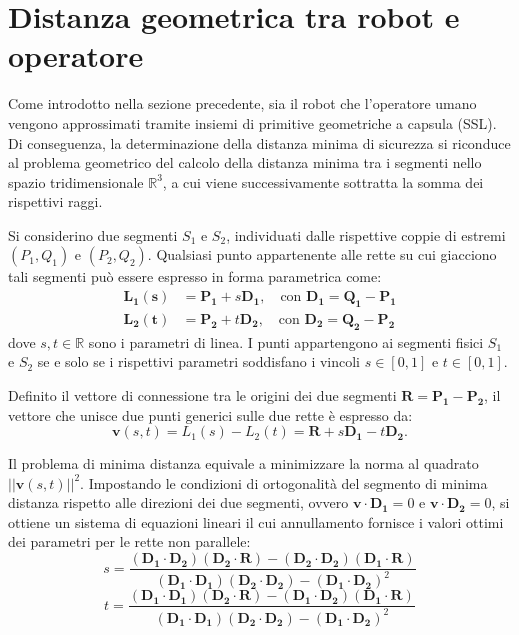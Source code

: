 \section{Distanza geometrica tra robot e operatore}

Come introdotto nella sezione precedente, sia il robot che l'operatore umano vengono approssimati tramite insiemi di primitive geometriche a capsula (SSL). Di conseguenza, la determinazione della distanza minima di sicurezza si riconduce al problema geometrico del calcolo della distanza minima tra i segmenti nello spazio tridimensionale $\mathbb{R}^3$, a cui viene successivamente sottratta la somma dei rispettivi raggi.

Si considerino due segmenti $S_1$ e $S_2$, individuati dalle rispettive coppie di estremi $(P_1, Q_1)$ e $(P_2, Q_2)$. Qualsiasi punto appartenente alle rette su cui giacciono tali segmenti può essere espresso in forma parametrica come:
\begin{align}
    \pmb{L_1(s)} &= \pmb{P_1} + s\pmb{D_1}, \quad \text{con } \pmb{D_1} = \pmb{Q_1} - \pmb{P_1} \\
    \pmb{L_2(t)} &= \pmb{P_2} + t\pmb{D_2}, \quad \text{con } \pmb{D_2} = \pmb{Q_2} - \pmb{P_2}
\end{align}
dove $s, t \in \mathbb{R}$ sono i parametri di linea. I punti appartengono ai segmenti fisici $S_1$ e $S_2$ se e solo se i rispettivi parametri soddisfano i vincoli $s \in [0,1]$ e $t \in [0, 1]$.

Definito il vettore di connessione tra le origini dei due segmenti $\pmb{R} = \pmb{P_1} - \pmb{P_2}$, il vettore che unisce due punti generici sulle due rette è espresso da:
\begin{equation}
    \pmb{v}(s,t) = L_1(s) - L_2(t) = \pmb{R} + s\pmb{D_1} - t\pmb{D_2}.
\end{equation}

Il problema di minima distanza equivale a minimizzare la norma al quadrato $||\pmb{v}(s,t)||^2$. Impostando le condizioni di ortogonalità del segmento di minima distanza rispetto alle direzioni dei due segmenti, ovvero $\pmb{v} \cdot \pmb{D_1} = 0$ e $\pmb{v} \cdot \pmb{D_2} = 0$, si ottiene un sistema di equazioni lineari il cui annullamento fornisce i valori ottimi dei parametri per le rette non parallele:
\begin{equation}
    s = \frac{(\pmb{D_1} \cdot \pmb{D_2})(\pmb{D_2} \cdot \pmb{R}) - (\pmb{D_2} \cdot \pmb{D_2})(\pmb{D_1} \cdot \pmb{R})}{(\pmb{D_1} \cdot \pmb{D_1})(\pmb{D_2} \cdot \pmb{D_2}) - (\pmb{D_1} \cdot \pmb{D_2})^2}
\end{equation}
\begin{equation}
    t = \frac{(\pmb{D_1} \cdot \pmb{D_1})(\pmb{D_2} \cdot \pmb{R}) - (\pmb{D_1} \cdot \pmb{D_2})(\pmb{D_1} \cdot \pmb{R})}{(\pmb{D_1} \cdot \pmb{D_1})(\pmb{D_2} \cdot \pmb{D_2}) - (\pmb{D_1} \cdot \pmb{D_2})^2}
\end{equation}

